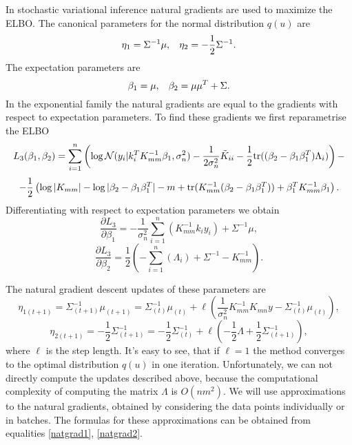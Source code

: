 \documentclass[12pt]{article}
\begin{document}
		In stochastic variational inference natural gradients are used to maximize the ELBO. The canonical parameters for the normal distribution $q(u)$ are
		$$\eta_1 = \Sigma^{-1} \mu, \hspace{0.3cm}\eta_2 = - \frac 1 2 \Sigma^{-1}.$$
		The expectation parameters are
		$$\beta_1 = \mu, \hspace{0.3cm}\beta_2 = \mu \mu^T + \Sigma.$$
		In the exponential family the natural gradients are equal to the gradients with respect to expectation parameters. To find these gradients we first reparametrise the ELBO
		$$L_3(\beta_1, \beta_2) =  \sum_{i = 1}^{n} \left( \log \mathcal{N}(y_i | k_i^T K_{mm}^{-1} \beta_1, \sigma_n^2) - \frac 1 {2 \sigma_n^2} \tilde K_{ii} - \frac 1 2 \mbox{tr} ((\beta_2 - \beta_1 \beta_1^T) \Lambda_i) \right) - $$
		$$ -\frac 1 2 \left (\log |K_{mm}| - \log |\beta_2 - \beta_1 \beta_1^T| - m + \mbox{tr}(K_{mm}^{-1} (\beta_2 - \beta_1 \beta_1^T)) + \beta_1^T K_{mm}^{-1} \beta_1 \right).$$
		Differentiating with respect to expectation parameters we obtain
		\begin{equation}
			\label{natgrad1}
			\frac{\partial L_3} {\partial\beta_1} =  -\frac 1 {\sigma_n^2}  \sum_{i = 1}^{n} \left(K_{mm}^{-1} k_i y_i \right) + \Sigma^{-1} \mu,
		\end{equation}
		\begin{equation}
			\label{natgrad2}
			\frac{\partial L_3} {\partial\beta_2} = \frac 1 {2} \left(-\sum_{i = 1}^{n} (\Lambda_i) + \Sigma^{-1}  - K_{mm}^{-1}\right).
		\end{equation}
		
		The natural gradient descent updates of these parameters are
		$$\eta_{1(t+1)} = \Sigma_{(t+1)}^{-1} \mu_{(t+1)} = \Sigma_{(t)}^{-1} \mu_{(t)} + \ell \left(\frac 1 {\sigma_n^2} K_{mm}^{-1} K_{mn} y - \Sigma_{(t)}^{-1} \mu_{(t)} \right), $$
		$$\eta_{2 (t+1)} = -\frac 1 2 \Sigma_{(t+1)}^{-1} = -\frac 1 2 \Sigma_{(t)}^{-1}  + \ell \left( -\frac 1 2 \Lambda + \frac 1 2 \Sigma_{(t+1)}^{-1}\right),$$
		where $\ell$ is the step length. It's easy to see, that if $\ell = 1$ the method converges to the optimal distribution $q(u)$ in one iteration. Unfortunately, we can not directly compute the updates described above, because the computational complexity of computing the matrix $\Lambda$ is $O(n m^2)$. We will use approximations to the natural gradients, obtained by considering the data points individually or in batches. The formulas for these approximations can be obtained from equalities \ref{natgrad1}, \ref{natgrad2}.
		
\end{document}
